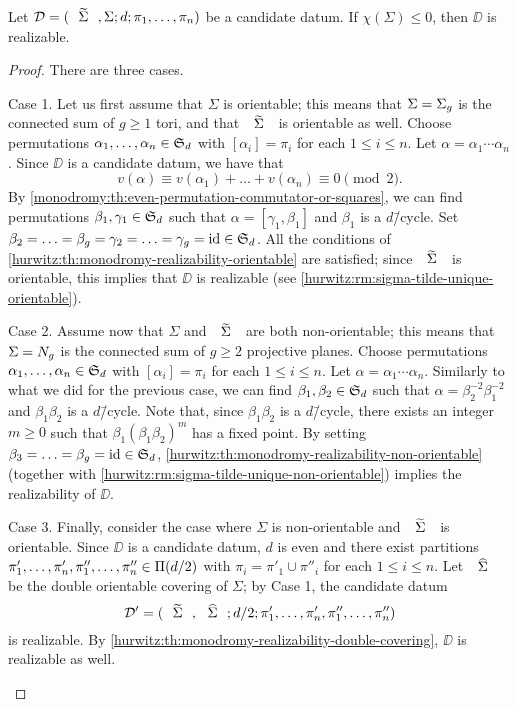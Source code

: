 \begin{theorem}\label{monodromy:th:realizability-nonpositive-chi}
Let $\DD=\datum{\tSigma,\Sigma}{d}{\pi_1,\ldots,\pi_n}$ be a candidate datum. If $\chi(\Sigma)\le 0$, then $\DD$ is realizable.
\end{theorem}
\begin{proof}
There are three cases.
\begin{sideline}{Case 1.}
Let us first assume that $\Sigma$ is orientable; this means that $\Sigma=\Sigma_{g}$ is the connected sum of $g\ge 1$ tori, and that $\tSigma$ is orientable as well. Choose permutations $\alpha_1,\ldots,\alpha_n\in\symgroup[d]$ with $[\alpha_i]=\pi_i$ for each $1\le i\le n$. Let $\alpha=\alpha_1\cdots\alpha_n$. Since $\DD$ is a candidate datum, we have that
\[
v(\alpha)\equiv v(\alpha_1)+\ldots+v(\alpha_n)\equiv 0\pmod{2}.
\]
By \cref{monodromy:th:even-permutation-commutator-or-squares}, we can find permutations $\beta_1,\gamma_1\in\symgroup[d]$ such that $\alpha=[\gamma_1,\beta_1]$ and $\beta_1$ is a $d$\=/cycle. Set $\beta_2=\ldots=\beta_g=\gamma_2=\ldots=\gamma_g=\id\in\symgroup[d]$. All the conditions of \cref{hurwitz:th:monodromy-realizability-orientable} are satisfied; since $\tSigma$ is orientable, this implies that $\DD$ is realizable (see \cref{hurwitz:rm:sigma-tilde-unique-orientable}).
\end{sideline}
\begin{sideline}{Case 2.}
Assume now that $\Sigma$ and $\tSigma$ are both non-orientable; this means that $\Sigma=N_{g}$ is the connected sum of $g\ge 2$ projective planes. Choose permutations $\alpha_1,\ldots,\alpha_n\in\symgroup[d]$ with $[\alpha_i]=\pi_i$ for each $1\le i\le n$. Let $\alpha=\alpha_1\cdots\alpha_n$. Similarly to what we did for the previous case, we can find $\beta_1,\beta_2\in\symgroup[d]$ such that $\alpha=\beta_2^{-2}\beta_1^{-2}$ and $\beta_1\beta_2$ is a $d$\=/cycle. Note that, since $\beta_1\beta_2$ is a $d$\=/cycle, there exists an integer $m\ge 0$ such that $\beta_1(\beta_1\beta_2)^m$ has a fixed point. By setting $\beta_3=\ldots=\beta_g=\id\in\symgroup[d]$, \cref{hurwitz:th:monodromy-realizability-non-orientable} (together with \cref{hurwitz:rm:sigma-tilde-unique-non-orientable}) implies the realizability of $\DD$.
\end{sideline}
\begin{sideline}{Case 3.}
Finally, consider the case where $\Sigma$ is non-orientable and $\tSigma$ is orientable. Since $\DD$ is a candidate datum, $d$ is even and there exist partitions $\pi'_1,\ldots,\pi'_n,\pi''_1,\ldots,\pi''_n\in\Pi(d/2)$ with $\pi_i=\pi'_1\cup\pi''_i$ for each $1\le i\le n$. Let $\hSigma$ be the double orientable covering of $\Sigma$; by Case 1, the candidate datum
\[
\DD'=\datum{\tSigma,\hSigma}{d/2}{\pi'_1,\ldots,\pi'_n,\pi''_1,\ldots,\pi''_n}
\]
is realizable. By \cref{hurwitz:th:monodromy-realizability-double-covering}, $\DD$ is realizable as well.\qedhere
\end{sideline}
\end{proof}

